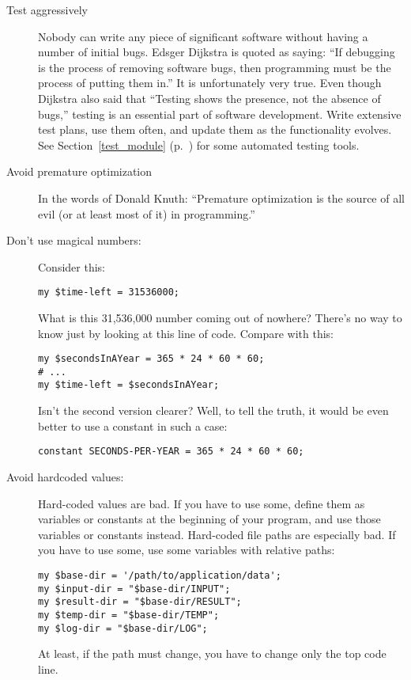 \begin{description}
\item[Test aggressively] Nobody can write any piece of 
significant software without having a number of initial 
bugs. Edsger Dijkstra is quoted as saying: ``If 
debugging is the process of removing software bugs,
then programming must be the process of putting them in.'' 
It is unfortunately very true. Even though Dijkstra 
also said that ``Testing shows the presence, not the absence 
of bugs,'' testing is an essential part of software 
development. Write extensive test plans, use them often, and 
update them as the functionality evolves. See Section~\ref{test_module} 
(p.~\pageref{test_module}) for some automated testing tools.

\item[Avoid premature optimization] In the words of Donald 
Knuth: ``Premature optimization is the source of all evil (or 
at least most of it) in programming.''

\item[Don't use magical numbers:] Consider this:
\begin{verbatim}
my $time-left = 31536000;
\end{verbatim}

What is this 31,536,000 number coming out of nowhere? 
There's no way to know just by looking at this line 
of code. Compare with this:

\begin{verbatim}
my $secondsInAYear = 365 * 24 * 60 * 60;
# ...
my $time-left = $secondsInAYear;
\end{verbatim}

Isn't the second version clearer? Well, to tell the 
truth, it would be even better to use a constant in 
such a case:
\begin{verbatim}
constant SECONDS-PER-YEAR = 365 * 24 * 60 * 60;
\end{verbatim}

\item[Avoid hardcoded values:] Hard-coded values are bad.
If you have to use some, define them as variables or constants 
at the beginning of your program, and use those variables or 
constants instead. Hard-coded file paths are especially bad. If you 
have to use some, use some variables with relative paths:
\begin{verbatim}
my $base-dir = '/path/to/application/data';
my $input-dir = "$base-dir/INPUT";
my $result-dir = "$base-dir/RESULT";
my $temp-dir = "$base-dir/TEMP";
my $log-dir = "$base-dir/LOG";
\end{verbatim}
At least, if the path must change, you have to change only 
the top code line.


\end{description}
